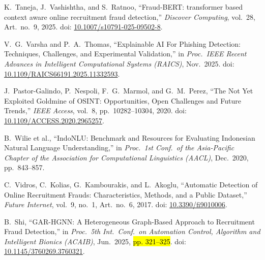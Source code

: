 \documentclass[12pt,a4paper]{article}
\newcommand{\revisi}[1]{\hl{#1}}
\begin{document}
\begin{enumerate}[label={[\arabic*]}, labelindent=0pt, leftmargin=0.95cm, labelwidth=0.60cm, labelsep=0.35cm, align=left, itemsep=0.3pt, parsep=0pt, topsep=1pt]
\item K.\ Taneja, J.\ Vashishtha, and S.\ Ratnoo, ``Fraud-BERT: transformer based context aware online
  recruitment fraud detection,'' \textit{Discover Computing}, vol.\ 28, Art.\ no.\ 9, 2025.
  doi: \href{https://doi.org/10.1007/s10791-025-09502-8}{10.1007/s10791-025-09502-8}.

\item V.\ G.\ Varsha and P.\ A.\ Thomas, ``Explainable AI For Phishing Detection: Techniques,
  Challenges, and Experimental Validation,'' in \textit{Proc.\ IEEE Recent Advances in
  Intelligent Computational Systems (RAICS)}, Nov.\ 2025.
  doi: \href{https://doi.org/10.1109/RAICS66191.2025.11332593}{10.1109/RAICS66191.2025.11332593}.

\item J.\ Pastor-Galindo, P.\ Nespoli, F.\ G.\ Marmol, and G.\ M.\ Perez, ``The Not Yet
  Exploited Goldmine of OSINT: Opportunities, Open Challenges and Future Trends,''
  \textit{IEEE Access}, vol.\ 8, pp.\ 10282--10304, 2020.
  doi: \href{https://doi.org/10.1109/ACCESS.2020.2965257}{10.1109/ACCESS.2020.2965257}.

\item B.\ Wilie et al., ``IndoNLU: Benchmark and Resources for Evaluating Indonesian Natural
  Language Understanding,'' in \textit{Proc.\ 1st Conf.\ of the Asia-Pacific Chapter of the
  Association for Computational Linguistics (AACL)}, Dec.\ 2020, pp.\ 843--857.

\item C.\ Vidros, C.\ Kolias, G.\ Kambourakis, and L.\ Akoglu, ``Automatic Detection of Online
  Recruitment Frauds: Characteristics, Methods, and a Public Dataset,'' \textit{Future Internet},
  vol.\ 9, no.\ 1, Art.\ no.\ 6, 2017. doi: \href{https://doi.org/10.3390/fi9010006}{10.3390/fi9010006}.

\item B.\ Shi, ``GAR-HGNN: A Heterogeneous Graph-Based Approach to Recruitment Fraud Detection,''
  in \textit{Proc.\ 5th Int.\ Conf.\ on Automation Control, Algorithm and Intelligent Bionics (ACAIB)},
  Jun.\ 2025, \revisi{pp. 321--325}. doi: \href{https://doi.org/10.1145/3760269.3760321}{10.1145/3760269.3760321}.

\end{enumerate}
\endgroup
\end{document}
